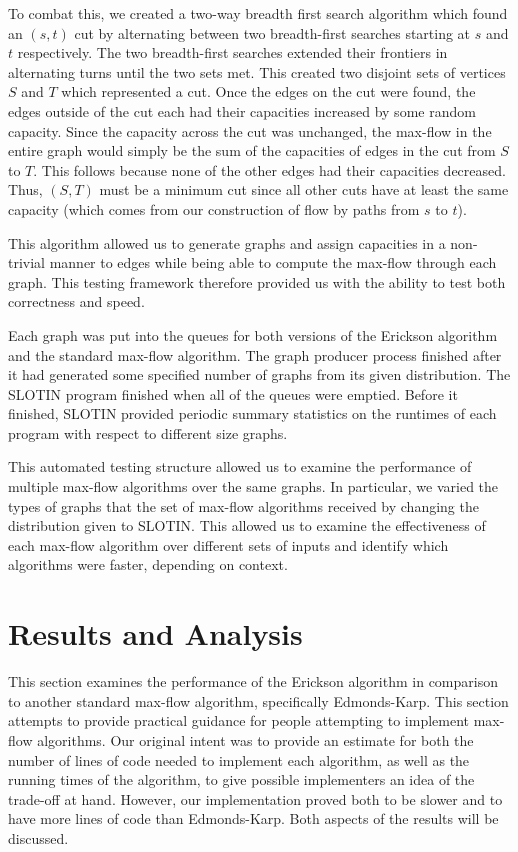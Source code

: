 \documentclass[12pt]{article}
\begin{document}
To combat this, we created a two-way breadth first search algorithm which found an $(s,t)$ cut by alternating between two breadth-first searches starting at $s$ and $t$ respectively. The two breadth-first searches extended their frontiers in alternating turns until the two sets met. This created two disjoint sets of vertices $S$ and $T$ which represented a cut. Once the edges on the cut were found, the edges outside of the cut each had their capacities increased by some random capacity. Since the capacity across the cut was unchanged, the max-flow in the entire graph would simply be the sum of the capacities of edges in the cut from $S$ to $T$. This follows because none of the other edges had their capacities decreased. Thus, $(S,T)$ must be a minimum cut since all other cuts have at least the same capacity (which comes from our construction of flow by paths from $s$ to $t$). 

This algorithm allowed us to generate graphs and assign capacities in a non-trivial manner to edges while being able to compute the max-flow through each graph. This testing framework therefore provided us with the ability to test both correctness and speed.

Each graph was put into the queues for both versions of the Erickson algorithm and the standard max-flow algorithm. The graph producer process finished after it had generated some specified number of graphs from its given distribution. The SLOTIN program finished when all of the queues were emptied. Before it finished, SLOTIN provided periodic summary statistics on the runtimes of each program with respect to different size graphs. 

This automated testing structure allowed us to examine the performance of multiple max-flow algorithms over the same graphs. In particular, we varied the types of graphs that the set of max-flow algorithms received by changing the distribution given to SLOTIN. This allowed us to examine the effectiveness of each max-flow algorithm over different sets of inputs and identify which algorithms were faster, depending on context. 

\section{Results and Analysis}

This section examines the performance of the Erickson algorithm in comparison to another standard max-flow algorithm, specifically Edmonds-Karp. This section attempts to provide practical guidance for people attempting to implement max-flow algorithms.  Our original intent was to provide an estimate for both the number of lines of code needed to implement each algorithm, as well as the running times of the algorithm, to give possible implementers an idea of the trade-off at hand.  However, our implementation proved both to be slower and to have more lines of code than Edmonds-Karp.  Both aspects of the results will be discussed.
\end{document}
